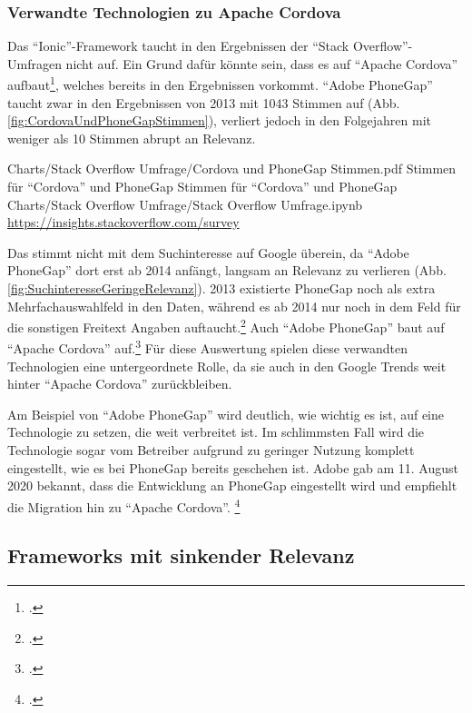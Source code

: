 \subsubsection{Verwandte Technologien zu Apache Cordova} Das \enquote{Ionic}-Framework taucht in den Ergebnissen der \enquote{Stack Overflow}-Umfragen nicht auf.
Ein Grund dafür könnte sein, dass es auf \enquote{Apache Cordova} aufbaut\footcite[Vgl.][]{TheLastWordOnCordovaAndPhoneGap}, welches bereits in den Ergebnissen vorkommt.
\enquote{Adobe PhoneGap} taucht zwar in den Ergebnissen von 2013 mit 1043 Stimmen auf (Abb. \ref{fig:CordovaUndPhoneGapStimmen}),
verliert jedoch in den Folgejahren mit weniger als 10 Stimmen abrupt an Relevanz.
\begin{alexfigurewithnotebook}{Charts/Stack Overflow Umfrage/Cordova und PhoneGap Stimmen.pdf}
	{Stimmen für \enquote{Cordova} und PhoneGap}
	{Stimmen für \enquote{Cordova} und PhoneGap}
	{Charts/Stack Overflow Umfrage/Stack Overflow Umfrage.ipynb}
	{\url{https://insights.stackoverflow.com/survey}}
	\label{fig:CordovaUndPhoneGapStimmen}

\end{alexfigurewithnotebook}

Das stimmt nicht mit dem Suchinteresse auf Google überein, da \enquote{Adobe PhoneGap} dort erst ab 2014 anfängt,
langsam an Relevanz zu verlieren (Abb. \ref{fig:SuchinteresseGeringeRelevanz}).
2013 existierte PhoneGap noch als extra Mehrfachauswahlfeld in den Daten, während es ab 2014 nur noch in dem Feld für die sonstigen Freitext Angaben auftaucht.\footcite[Vgl.][]{StackOverflowInsights}
Auch \enquote{Adobe PhoneGap} baut auf \enquote{Apache Cordova} auf.\footcite[Vgl.][]{FaqPhoneGapDocs}
Für diese Auswertung spielen diese verwandten Technologien eine untergeordnete Rolle, da sie auch in den Google Trends weit hinter \enquote{Apache Cordova} zurückbleiben.

Am Beispiel von \enquote{Adobe PhoneGap} wird deutlich, wie wichtig es ist, auf eine Technologie zu setzen, die weit verbreitet ist.
Im schlimmsten Fall wird die Technologie sogar vom Betreiber aufgrund zu geringer Nutzung komplett eingestellt, wie es bei PhoneGap bereits geschehen ist.
Adobe gab am 11.
August 2020 bekannt, dass die  Entwicklung an PhoneGap eingestellt wird und empfiehlt die Migration hin zu \enquote{Apache Cordova}.  \footcite[Vgl.][]{UpdateForCustomersUsingPhoneGapAndPhoneGapBuild}

\subsection{Frameworks mit sinkender Relevanz}

